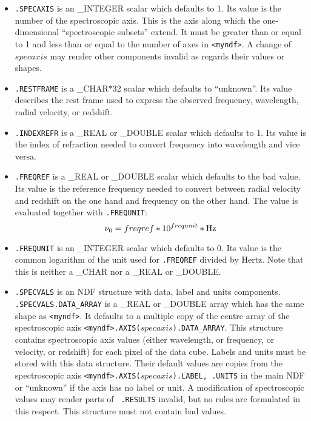 \begin{itemize}

\item{\tt .SPECAXIS} is an \_INTEGER scalar which defaults to 1. Its value is
the number of the spectroscopic axis. This is the axis along which the
one-dimensional ``spectroscopic subsets'' extend. It must be greater than or
equal to 1 and less than or equal to the number of axes in {\tt <myndf>}. A
change of $specaxis$ may render other components invalid as regards their
values or shapes.

\item{\tt .RESTFRAME} is a \_CHAR$*$32 scalar which defaults to ``unknown''.
Its value describes the rest frame used to express the observed frequency,
wavelength, radial velocity, or redshift.

\item{\tt .INDEXREFR} is a \_REAL or \_DOUBLE scalar which defaults to 1. Its
value is the index of refraction needed to convert frequency into wavelength
and vice versa.

\item{\tt .FREQREF} is a \_REAL or \_DOUBLE scalar which defaults to the bad
value. Its value is the reference frequency needed to convert between radial
velocity and redshift on the one hand and frequency on the other hand. The
value is evaluated together with {\tt .FREQUNIT}:
$$\nu_0=freqref*10^{frequnit}*{\rm Hz}$$

\item{\tt .FREQUNIT} is an \_INTEGER scalar which defaults to 0. Its value is
the common logarithm of the unit used for {\tt .FREQREF} divided by Hertz.
Note that this is neither a \_CHAR nor a \_REAL or \_DOUBLE.

\item{\tt .SPECVALS} is an NDF structure with data, label and units
components. {\tt .SPECVALS.\-DATA\_\-ARRAY} is a \_REAL or \_DOUBLE
array which has the same shape as {\tt <myndf>}.
It defaults to a multiple copy of the centre array of the
spectroscopic axis {\tt <myndf>.AXIS\-($specaxis$)\-.DATA\_\-ARRAY}.
This structure contains spectroscopic axis values (either
wavelength, or frequency, or velocity, or redshift) for each pixel of the data
cube. Labels and units must be stored with this data structure. Their default
values are copies from the spectroscopic axis
{\tt <myndf>.AXIS($specaxis$).LABEL, .UNITS} in
the main NDF or ``unknown'' if the axis has no label or unit.
A modification of spectroscopic values may render parts of {\tt
.RESULTS} invalid, but no rules are formulated in this respect.
This structure must not contain bad values.


\end{itemize}
